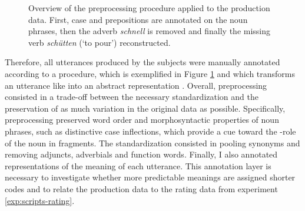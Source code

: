 \begin{figure}
\caption{Overview of the preprocessing procedure applied to the production data. First, case and prepositions are annotated on the noun phrases, then the adverb \textit{schnell} is removed and finally the missing verb \textit{schütten} (`to pour') reconstructed.\label{fig:prod-preprocessing}}
\end{figure}
%
Therefore, all utterances produced by the subjects were manually annotated according to a procedure, which is exemplified in Figure \ref{fig:prod-preprocessing} and which transforms an utterance like \Next[a] into an abstract representation \Next[b]. Overall, preprocessing consisted in a trade-off between the necessary standardization and the preservation of as much variation in the original data as possible. Specifically, preprocessing preserved word order and morphosyntactic properties of noun phrases, such as distinctive case inflections, which provide a cue toward the \texttheta-role of the noun in fragments. The standardization consisted in pooling synonyms and removing adjuncts, adverbials and function words. Finally, I also annotated representations of the meaning of each utterance. This annotation layer is necessary to investigate whether more predictable meanings are assigned shorter codes and to relate the production data to the rating data from experiment \ref{exp:scripts-rating}.

